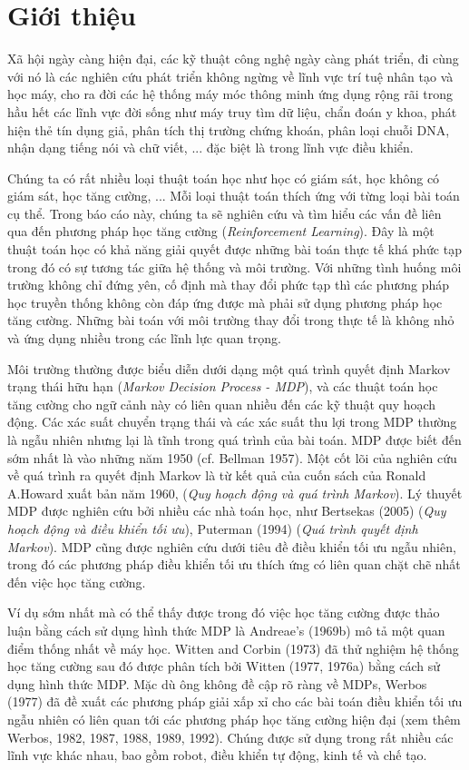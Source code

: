 \chapter{Giới thiệu}
\label{ch:intro}
	Xã hội ngày càng hiện đại, các kỹ thuật công nghệ ngày càng phát triển, đi cùng với nó là các nghiên cứu phát triển không ngừng về lĩnh vực trí tuệ nhân tạo và học máy, cho ra đời các hệ thống máy móc thông minh ứng dụng rộng rãi trong hầu hết các lĩnh vực đời sống như máy truy tìm dữ liệu, chẩn đoán y khoa, phát hiện thẻ tín dụng giả, phân tích thị trường chứng khoán, phân loại chuỗi DNA, nhận dạng tiếng nói và chữ viết, ... đặc biệt là trong lĩnh vực điều khiển.
	
	Chúng ta có rất nhiều loại thuật toán học như học có giám sát, học không có giám sát, học tăng cường, ... Mỗi loại thuật toán thích ứng với từng loại bài toán cụ thể. Trong báo cáo này, chúng ta sẽ nghiên cứu và tìm hiểu các vấn đề liên qua đến phương pháp học tăng cường (\textit{Reinforcement Learning}). Đây là một thuật toán học có khả năng giải quyết được những bài toán thực tế khá phức tạp trong đó có sự tương tác giữa hệ thống và môi trường. Với những tình huống môi trường không chỉ đứng yên, cố định mà thay đổi phức tạp thì các phương pháp học truyền thống không còn đáp ứng được mà phải sử dụng phương pháp học tăng cường. Những bài toán với môi trường thay đổi trong thực tế là không nhỏ và ứng dụng nhiều trong các lĩnh lực quan trọng.
	
	Môi trường thường được biểu diễn dưới dạng một quá trình quyết định Markov trạng thái hữu hạn (\textit{Markov Decision Process - MDP}), và các thuật toán học tăng cường cho ngữ cảnh này có liên quan nhiều đến các kỹ thuật quy hoạch động. Các xác suất chuyển trạng thái và các xác suất thu lợi trong MDP thường là ngẫu nhiên nhưng lại là tĩnh trong quá trình của bài toán. MDP được biết đến sớm nhất \cite{Belman1957} là vào những năm 1950 (cf. Bellman 1957). Một cốt lõi của nghiên cứu về quá trình ra quyết định Markov là từ kết quả của cuốn sách \cite{Howard1960} của Ronald A.Howard xuất bản năm 1960, (\textit{Quy hoạch động và quá trình Markov}). Lý thuyết MDP được nghiên cứu bởi nhiều các nhà toán học, như \cite{Bertsekas2005} Bertsekas (2005) (\textit{Quy hoạch động và điều khiển tối ưu}), \cite{Puterman1994} Puterman (1994) (\textit{Quá trình quyết định Markov}). MDP cũng được nghiên cứu dưới tiêu đề điều khiển tối ưu ngẫu nhiên, trong đó các phương pháp điều khiển tối ưu thích ứng có liên quan chặt chẽ nhất đến việc học tăng cường.
	
		Ví dụ sớm nhất mà có thể thấy được trong đó việc học tăng cường được thảo luận bằng cách sử dụng hình thức MDP là Andreae’s (1969b) mô tả một quan điểm thống nhất về máy học. Witten and Corbin (1973) đã thử nghiệm hệ thống học tăng cường sau đó được phân tích bởi Witten (1977, 1976a) bằng cách sử dụng hình thức MDP. Mặc dù ông không đề cập rõ ràng về MDPs, Werbos (1977) đã đề xuất các phương pháp giải xấp xỉ cho các bài toán điều khiển tối ưu ngẫu nhiên có liên quan tới các phương pháp học tăng cường hiện đại (xem thêm Werbos, 1982, 1987, 1988, 1989, 1992). Chúng được sử dụng trong rất nhiều các lĩnh vực khác nhau, bao gồm robot, điều khiển tự động, kinh tế và chế tạo.\\
	
